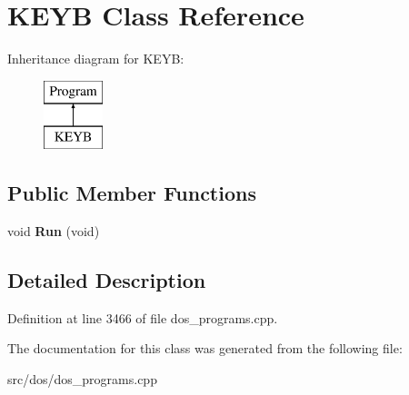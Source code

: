 \hypertarget{classKEYB}{\section{K\-E\-Y\-B Class Reference}
\label{classKEYB}
}
Inheritance diagram for K\-E\-Y\-B\-:\begin{figure}[H]
\begin{center}
\leavevmode
\includegraphics[height=2.000000cm]{classKEYB}
\end{center}
\end{figure}
\subsection*{Public Member Functions}
\begin{DoxyCompactItemize}
\item 
\hypertarget{classKEYB_a0ddb778460bbba0ce194908d8a405d24}{void {\bfseries Run} (void)}\label{classKEYB_a0ddb778460bbba0ce194908d8a405d24}

\end{DoxyCompactItemize}


\subsection{Detailed Description}


Definition at line 3466 of file dos\-\_\-programs.\-cpp.



The documentation for this class was generated from the following file\-:\begin{DoxyCompactItemize}
\item 
src/dos/dos\-\_\-programs.\-cpp\end{DoxyCompactItemize}
